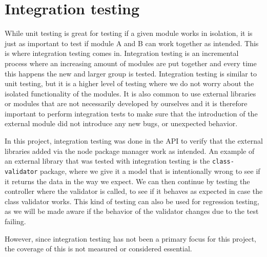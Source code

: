 \section{Integration testing}\label{sec:integrationTesting}
While unit testing is great for testing if a given module works in isolation, it is just as important to test if module A and B can work together as intended.
This is where integration testing comes in. 
Integration testing is an incremental process where an increasing amount of modules are put together and every time this happens the new and larger group is tested.
Integration testing is similar to unit testing, but it is a higher level of testing where we do not worry about the isolated functionality of the modules.
It is also common to use external libraries or modules that are not necessarily developed by ourselves and it is therefore important to perform integration tests to make sure that the introduction of the external module did not introduce any new bugs, or unexpected behavior.  

In this project, integration testing was done in the API to verify that the external libraries added via the node package manager work as intended.
An example of an external library that was tested with integration testing is the \texttt{class-validator} package, where we give it a model that is intentionally wrong to see if it returns the data in the way we expect.
We can then continue by testing the controller where the validator is called, to see if it behaves as expected in case the class validator works.
This kind of testing can also be used for regression testing, as we will be made aware if the behavior of the validator changes due to the test failing.

However, since integration testing has not been a primary focus for this project, the coverage of this is not measured or considered essential.